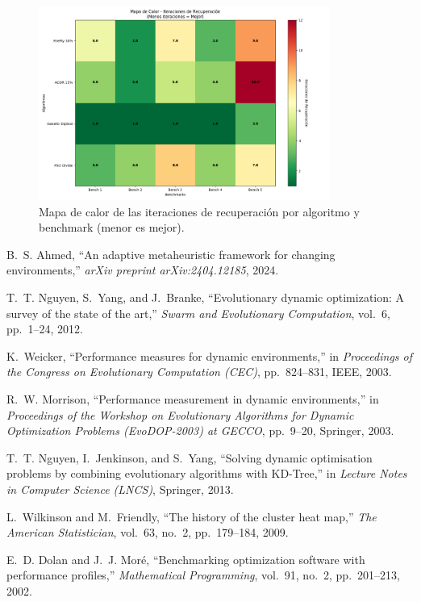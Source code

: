 \documentclass[10pt]{article}
\begin{document}
\begin{figure}[H]
    \centering
    \includegraphics[width=0.85\textwidth]{imagenes/mapaDeCalor.png}
    \caption{Mapa de calor de las iteraciones de recuperación por algoritmo y benchmark (menor es mejor).}
    \label{fig:heatmap}
\end{figure}



\begin{thebibliography}{99}

B.~S. Ahmed,
``An adaptive metaheuristic framework for changing environments,''
\emph{arXiv preprint arXiv:2404.12185}, 2024.

T.~T. Nguyen, S.~Yang, and J.~Branke,
``Evolutionary dynamic optimization: A survey of the state of the art,''
\emph{Swarm and Evolutionary Computation}, vol.~6, pp.~1--24, 2012.

K.~Weicker,
``Performance measures for dynamic environments,''
in \emph{Proceedings of the Congress on Evolutionary Computation (CEC)}, pp.~824--831, IEEE, 2003.

R.~W. Morrison,
``Performance measurement in dynamic environments,''
in \emph{Proceedings of the Workshop on Evolutionary Algorithms for Dynamic Optimization Problems (EvoDOP-2003) at GECCO}, pp.~9--20, Springer, 2003.

T.~T. Nguyen, I.~Jenkinson, and S.~Yang,
``Solving dynamic optimisation problems by combining evolutionary algorithms with KD-Tree,''
in \emph{Lecture Notes in Computer Science (LNCS)}, Springer, 2013.

L.~Wilkinson and M.~Friendly,
``The history of the cluster heat map,''
\emph{The American Statistician}, vol.~63, no.~2, pp.~179--184, 2009.

E.~D. Dolan and J.~J. Mor{\'e},
``Benchmarking optimization software with performance profiles,''
\emph{Mathematical Programming}, vol.~91, no.~2, pp.~201--213, 2002.

\end{thebibliography}
\end{document}
